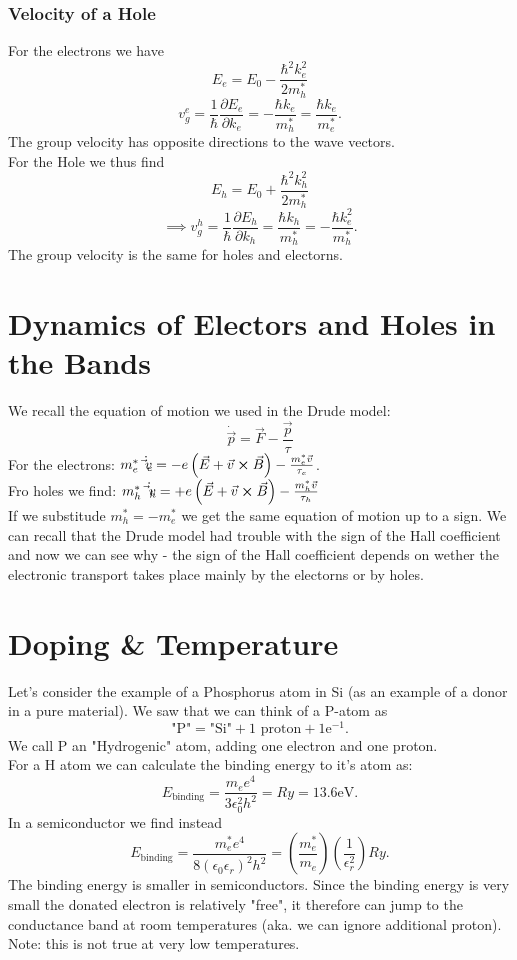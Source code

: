 \documentclass{report}
\begin{document}
\subsubsection{Velocity of a Hole}
For the electrons we have \[
E_e = E_0 - \frac{\hbar^2 k_e^2}{2m_h^*}
\] \[
v_g^e = \frac{1}{\hbar } \frac{\partial E_e}{\partial k_e} = - \frac{\hbar k_e}{m_h^*} = \frac{\hbar k_e}{m_e^*}
.\] The group velocity has opposite directions to the wave vectors.\\
For the Hole we thus find \[
E_h = E_0 + \frac{\hbar^2 k_h^2}{2m_h^*}
\] \[
\implies v_g^h = \frac{1}{\hbar } \frac{\partial E_h}{\partial k_h} = \frac{\hbar k_h}{m_h^*} = -\frac{\hbar k_e^2}{m_h^*}
.\]  The group velocity is the same for holes and electorns.
\section{Dynamics of Electors and Holes in the Bands}
We recall the equation of motion we used in the Drude model: \[
	\dot{\vec{p}} = \vec{F} - \frac{\vec{p}}{\tau}
\] 
For the electrons: $m_e^* \dot{\vec{v}_e} = -e\left( \vec{E} + \vec{v} \cross \vec{B} \right) - \frac{m_e^* \vec{v}}{\tau_e}$.\\
Fro holes we find: $m_h^* \dot{\vec{v}_h} = +e\left( \vec{E} + \vec{v} \cross \vec{B} \right) - \frac{m_h^* \vec{v}}{\tau_h}$ \\
If we substitude $m_h^* = - m_e^*$ we get the same equation of motion up to a sign. We can recall that the Drude model had trouble with the sign of the Hall coefficient and now we can see why - the sign of the Hall coefficient depends on wether the electronic transport takes place mainly by the electorns or by holes.\\
\section{Doping \& Temperature}
Let's consider the example of a Phosphorus atom in Si (as an example of a donor in a pure material). We saw that we can think of a P-atom as \[
	\text{"P"} = \text{"Si"} + 1 \text{ proton} + 1 \text{e}^{-1}
.\] We call P an "Hydrogenic" atom, adding one electron and one proton. \\
For a H atom we can calculate the binding energy to it's atom as: \[
E_\text{binding}= \frac{m_e e^4}{3 \epsilon_0^2 h^2} = Ry = 13.6 \text{eV}
.\] In a semiconductor we find instead \[
E_\text{binding} = \frac{m_e^* e^4}{8\left( \epsilon_0 \epsilon_r \right)^2 h^2} = \left( \frac{m_e^*}{m_e} \right) \left( \frac{1}{\epsilon_r^2} \right) Ry
.\] The binding energy is smaller in semiconductors. Since the binding energy is very small the donated electron is relatively "free", it therefore can jump to the conductance band at room temperatures (aka. we can ignore additional proton). Note: this is not true at very low temperatures.
\end{document}
